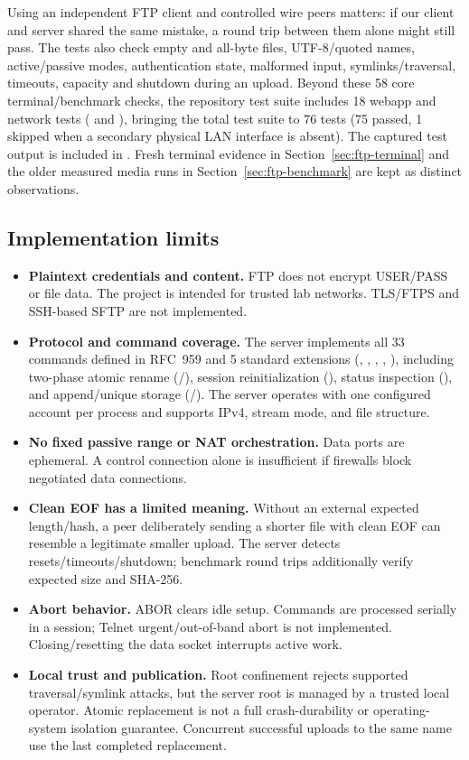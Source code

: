 Using an independent FTP client and controlled wire peers matters: if our client and server shared the same mistake, a round trip between them alone might still pass. The tests also check empty and all-byte files, UTF-8/quoted names, active/passive modes, authentication state, malformed input, symlinks/traversal, timeouts, capacity and shutdown during an upload. Beyond these 58 core terminal/benchmark checks, the repository test suite includes 18 webapp and network tests ( and ), bringing the total test suite to 76 tests (75 passed, 1 skipped when a secondary physical LAN interface is absent). The captured test output is included in . Fresh terminal evidence in Section~\ref{sec:ftp-terminal} and the older measured media runs in Section~\ref{sec:ftp-benchmark} are kept as distinct observations.

\subsection{Implementation limits}
\begin{itemize}[nosep]
\item \textbf{Plaintext credentials and content.} FTP does not encrypt USER/PASS or file data. The project is intended for trusted lab networks. TLS/FTPS and SSH-based SFTP are not implemented.
\item \textbf{Protocol and command coverage.} The server implements all 33 commands defined in RFC~959 and 5 standard extensions (, , , , ), including two-phase atomic rename (/), session reinitialization (), status inspection (), and append/unique storage (/). The server operates with one configured account per process and supports IPv4, stream mode, and file structure.
\item \textbf{No fixed passive range or NAT orchestration.} Data ports are ephemeral. A control connection alone is insufficient if firewalls block negotiated data connections.
\item \textbf{Clean EOF has a limited meaning.} Without an external expected length/hash, a peer deliberately sending a shorter file with clean EOF can resemble a legitimate smaller upload. The server detects resets/timeouts/shutdown; benchmark round trips additionally verify expected size and SHA-256.
\item \textbf{Abort behavior.} ABOR clears idle setup. Commands are processed serially in a session; Telnet urgent/out-of-band abort is not implemented. Closing/resetting the data socket interrupts active work.
\item \textbf{Local trust and publication.} Root confinement rejects supported traversal/symlink attacks, but the server root is managed by a trusted local operator. Atomic replacement is not a full crash-durability or operating-system isolation guarantee. Concurrent successful uploads to the same name use the last completed replacement.
\end{itemize}

